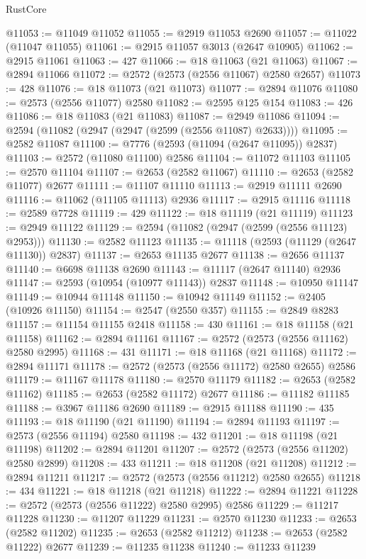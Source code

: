 \begin{lexlean}{RustCore}
\begin{coremodule}
@11053 := @11049 @11052
@11055 := @2919 @11053 @2690
@11057 := @11022 (@11047 @11055)
@11061 := @2915 @11057 @3013 (@2647 @10905)
@11062 := @2915 @11061
@11063 := 427
@11066 := @18 @11063 (@21 @11063)
@11067 := @2894 @11066
@11072 := @2572 (@2573 (@2556 @11067) @2580 @2657)
@11073 := 428
@11076 := @18 @11073 (@21 @11073)
@11077 := @2894 @11076
@11080 := @2573 (@2556 @11077) @2580
@11082 := @2595 @125 @154
@11083 := 426
@11086 := @18 @11083 (@21 @11083)
@11087 := @2949 @11086
@11094 := @2594 (@11082 (@2947 (@2947 (@2599 (@2556 @11087) @2633))))
@11095 := @2582 @11087
@11100 := @7776 (@2593 (@11094 (@2647 @11095)) @2837)
@11103 := @2572 (@11080 @11100) @2586
@11104 := @11072 @11103
@11105 := @2570 @11104
@11107 := @2653 (@2582 @11067)
@11110 := @2653 (@2582 @11077) @2677
@11111 := @11107 @11110
@11113 := @2919 @11111 @2690
@11116 := @11062 (@11105 @11113) @2936
@11117 := @2915 @11116
@11118 := @2589 @7728
@11119 := 429
@11122 := @18 @11119 (@21 @11119)
@11123 := @2949 @11122
@11129 := @2594 (@11082 (@2947 (@2599 (@2556 @11123) @2953)))
@11130 := @2582 @11123
@11135 := @11118 (@2593 (@11129 (@2647 @11130)) @2837)
@11137 := @2653 @11135 @2677
@11138 := @2656 @11137
@11140 := @6698 @11138 @2690
@11143 := @11117 (@2647 @11140) @2936
@11147 := @2593 (@10954 (@10977 @11143)) @2837
@11148 := @10950 @11147
@11149 := @10944 @11148
@11150 := @10942 @11149
@11152 := @2405 (@10926 @11150)
@11154 := @2547 (@2550 @357)
@11155 := @2849 @8283
@11157 := @11154 @11155 @2418
@11158 := 430
@11161 := @18 @11158 (@21 @11158)
@11162 := @2894 @11161
@11167 := @2572 (@2573 (@2556 @11162) @2580 @2995)
@11168 := 431
@11171 := @18 @11168 (@21 @11168)
@11172 := @2894 @11171
@11178 := @2572 (@2573 (@2556 @11172) @2580 @2655) @2586
@11179 := @11167 @11178
@11180 := @2570 @11179
@11182 := @2653 (@2582 @11162)
@11185 := @2653 (@2582 @11172) @2677
@11186 := @11182 @11185
@11188 := @3967 @11186 @2690
@11189 := @2915 @11188
@11190 := 435
@11193 := @18 @11190 (@21 @11190)
@11194 := @2894 @11193
@11197 := @2573 (@2556 @11194) @2580
@11198 := 432
@11201 := @18 @11198 (@21 @11198)
@11202 := @2894 @11201
@11207 := @2572 (@2573 (@2556 @11202) @2580 @2899)
@11208 := 433
@11211 := @18 @11208 (@21 @11208)
@11212 := @2894 @11211
@11217 := @2572 (@2573 (@2556 @11212) @2580 @2655)
@11218 := 434
@11221 := @18 @11218 (@21 @11218)
@11222 := @2894 @11221
@11228 := @2572 (@2573 (@2556 @11222) @2580 @2995) @2586
@11229 := @11217 @11228
@11230 := @11207 @11229
@11231 := @2570 @11230
@11233 := @2653 (@2582 @11202)
@11235 := @2653 (@2582 @11212)
@11238 := @2653 (@2582 @11222) @2677
@11239 := @11235 @11238
@11240 := @11233 @11239

\end{coremodule}
\end{lexlean}
